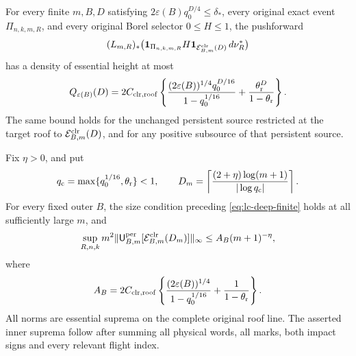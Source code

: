 \begin{theorem}
\label{thm:lc-deep-payment}
For every finite $m,B,D$ satisfying
$2\varepsilon(B)q_0^{D/4}\le\delta_*$, every original exact event
$\Pi_{n,k,m,R}$, and every original Borel selector $0\le H\le1$,
the pushforward
\[
 (L_{m,R})_*\bigl(\mathbf1_{\Pi_{n,k,m,R}}H
                \mathbf1_{\mathcal E^{\rm clr}_{B,m}(D)}\,d\nu_R^*\bigr)
\]
has a density of essential height at most
\begin{equation}\label{eq:lc-deep-finite}
 Q_{\varepsilon(B)}(D)
 =2C_{\rm clr,roof}\left\{
   \frac{(2\varepsilon(B))^{1/4}q_0^{D/16}}{1-q_0^{1/16}}
                   +\frac{\theta_{\rm r}^{D}}{1-\theta_{\rm r}}
                    \right\}.
\end{equation}
The same bound holds for the unchanged persistent source restricted
at the target roof to $\mathcal E^{\rm clr}_{B,m}(D)$, and for any
positive subsource of that persistent source.

Fix $\eta>0$, and put
\begin{equation}\label{eq:lc-log-depth}
 q_{\rm c}=\max\{q_0^{1/16},\theta_{\rm r}\}<1,\qquad
 D_m=\left\lceil\frac{(2+\eta)\log(m+1)}{|\log q_{\rm c}|}\right\rceil.
\end{equation}
For every fixed outer $B$, the size condition preceding
\eqref{eq:lc-deep-finite} holds at all sufficiently large $m$, and
\begin{equation}\label{eq:lc-normalized-rate}
 \sup_{R,n,k}m^2
 \|\mathsf U_{B,m}^{\rm per}[\mathcal E^{\rm clr}_{B,m}(D_m)]\|_\infty
 \le A_B(m+1)^{-\eta},
\end{equation}
where
\begin{equation}\label{eq:lc-AB}
 A_B=2C_{\rm clr,roof}\left\{
       \frac{(2\varepsilon(B))^{1/4}}{1-q_0^{1/16}}
                              +\frac1{1-\theta_{\rm r}}\right\}.
\end{equation}
All norms are essential suprema on the complete original roof line.
The asserted inner suprema follow after summing all physical words,
all marks, both impact signs and every relevant flight index.
\end{theorem}
